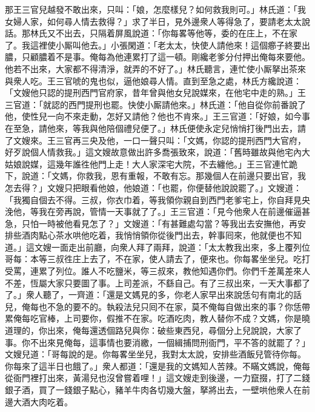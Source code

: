 那王三官兒越發不敢出來，只叫：「娘，怎麼樣兒？如何救我則可。」林氏道：「我女婦人家，如何尋人情去救得？」求了半日，見外邊衆人等得急了，要請老太太說話。那林氏又不出去，只隔着屏風說道：「你每畧等他等，委的在庄上，不在家了。我這裡使小厮叫他去。」小張閑道：「老太太，快使人請他來！這個癤子終要出膿，只顧膿着不是事。{}俺每為他連累打了這一頓。剛纔老爹分付押出俺每來要他。他若不出來，大家都不得清淨，就弄的不好了。」林氏聽言，連忙使小厮拏出茶來與衆人吃。王三官唬的鬼也似，逼他娘尋人情。{}直到至急之處，林氏方纔說道：「文嫂他只認的提刑西門官府家，昔年曾與他女兒說媒來，在他宅中走的熟。」王三官道：「就認的西門提刑也罷。快使小厮請他來。」林氏道：「他自從你前番說了他，使性兒一向不來走動，怎好又請他？他也不肯來。」王三官道：「好娘，如今事在至急，請他來，等我與他陪個禮兒便了。」{}林氏便使永定兒悄悄打後門出去，請了文嫂來。王三官再三央及他，一口一聲只叫：{}「文媽，你認的提刑西門大官府，好歹說個人情救我。」這文嫂故意做出許多喬張致來，說道：「舊時雖故與他宅內大姑娘說媒，這幾年誰徃他門上走！大人家深宅大院，不去纏他。」王三官連忙跪下，{}說道：「文媽，你救我，恩有重報，不敢有忘。那幾個人在前邊只要出官，我怎去得？」文嫂只把眼看他娘，他娘道：「也罷，你便替他說說罷了。」文嫂道：「我獨自個去不得。三叔，你衣巾着，等我領你親自到西門老爹宅上，你自拜見央浼他，等我在旁再說，管情一天事就了了。」王三官道：「見今他衆人在前邊催逼甚急，只怕一時被他看見怎了？」文嫂道：「有甚難處勾當？等我出去安撫他，再安排些酒肉點心茶水哄他吃着，我悄悄領你從後門出去，幹事囘來，他就便也不知道。」這文嫂一面走出前廳，向衆人拜了兩拜，說道：「太太教我出來，多上覆列位哥每：本等三叔徃庄上去了，不在家，使人請去了，便來也。你每畧坐坐兒。吃打受罵，連累了列位。誰人不吃鹽米，等三叔來，教他知遇你們。你們千差萬差來人不差，恆屬大家只要圖了事。上司差派，不繇自己。有了三叔出來，一天大事都了了。」衆人聽了，一齊道：「還是文媽見的多，你老人家早出來說恁句有南北的話兒，俺每也不急的要不的。執殺法兒只囘不在家，莫不俺每自做出來的事？你恁帶累俺每吃官棒，上司要你，假推不在家。吃酒吃肉，教人替你不成？文媽，你是曉道理的，你出來，俺每還透個路兒與你：破些東西兒，尋個分上兒說說，大家了事。你不出來見俺每，這事情也要消繳，一個緝捕問刑衙門，平不答的就罷了？」文嫂兒道：「哥每說的是。你每畧坐坐兒，我對太太說，安排些酒飯兒管待你每。你每來了這半日也餓了。」衆人都道：「還是我的文媽知人苦辣。不瞞文媽說，俺每從衙門裡打出來，黃湯兒也沒曾嘗着哩！」這文嫂走到後邊，一力竄掇，打了二錢銀子酒，買了一錢銀子點心，豬羊牛肉各切幾大盤，拏將出去，一壁哄他衆人在前邊大酒大肉吃着。

